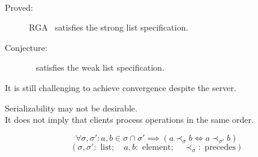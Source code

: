 \begin{frame}{}
  \begin{center}
    ~ \\[6pt]
  \end{center}


  \vspace{0.50cm}
  \begin{center}
    \begin{description}
      \item[Proved:] RGA~ satisfies the strong list specification.
      \item[Conjecture:] ~ satisfies the weak list specification.
    \end{description}
  \end{center}
\end{frame}

\begin{frame}{}
  \centerline{It is still challenging to achieve convergence despite the server.}
  

  \begin{center}
    Serializability may not be desirable. \\[6pt]
    It does not imply that clients process operations in the same order.
  \end{center}
\end{frame}

\begin{frame}{}
  \[
    \forall \sigma, \sigma': a, b \in \sigma \cap \sigma' \implies (a \prec_{\sigma} b \iff a \prec_{\sigma'} b)
  \]
  \[
    (\sigma, \sigma': \text{ list}; \quad a, b: \text{ element}; \quad \prec_{\sigma}: \text{ precedes})
  \]

  \begin{columns}
      \vspace{-0.60cm}
      \vspace{-0.60cm}
  \end{columns}
\end{frame}

